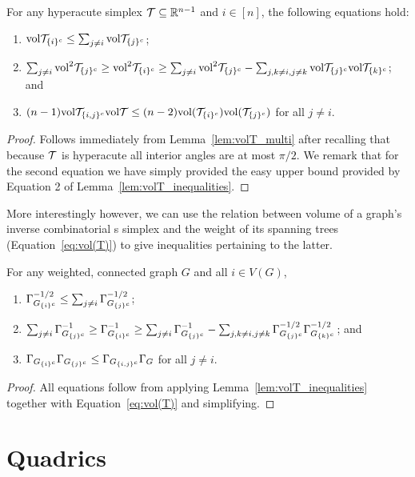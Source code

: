 \begin{lemma}
\label{lem:volT_inequalities}
For any hyperacute simplex $\mathcal{T}\subseteq\mathbb{R}^{n-1}$ and  $i\in[n]$, the following equations hold:
\begin{enumerate}
	\item $\textnormal{vol}\mathcal{T}_{\{i\}^c} \leq \sum_{j\neq i}\textnormal{vol}\mathcal{T}_{\{j\}^c}$;
	\item $\sum_{j\neq i}\textnormal{vol}^2\mathcal{T}_{\{j\}^c}\geq \textnormal{vol}^2\mathcal{T}_{\{i\}^c}\geq   \sum_{j\neq i}\textnormal{vol}^2\mathcal{T}_{\{j\}^c} - \sum_{j,k\neq i,j\neq k} \textnormal{vol}\mathcal{T}_{\{j\}^c}\textnormal{vol}\mathcal{T}_{\{k\}^c}$; and
	\item $(n-1)\textnormal{vol}\mathcal{T}_{\{i,j\}^c}\textnormal{vol}\mathcal{T} \leq  (n-2)\textnormal{vol}(\mathcal{T}_{\{i\}^c})\textnormal{vol}(\mathcal{T}_{\{j\}^c})$ for  all $j\neq i$.
\end{enumerate}
\end{lemma}
\begin{proof}
	Follows immediately from Lemma~\ref{lem:volT_multi} after  recalling that because $\mathcal{T}$  is  hyperacute all interior  angles are at most $\pi/2$. We remark that for the second  equation  we have simply provided the  easy  upper bound provided by Equation 2 of Lemma~\ref{lem:volT_inequalities}. 
\end{proof}

More interestingly  however,  we can use the relation between volume of a  graph's inverse combinatorial s simplex and the weight of its spanning trees (Equation~\eqref{eq:vol(T)})  to give inequalities pertaining to the latter.  

\begin{lemma}
	\label{lem:tree_inequalities}
	For any weighted,  connected  graph  $G$ and all $i\in V(G)$, 
	\begin{enumerate}
		\item $\Gamma_{G_{\{i\}^c}}^{-1/2} \leq \sum_{j\neq i}\Gamma_{G_{\{j\}^c}}^{-1/2}$;
		\item $\sum_{j\neq i}\Gamma_{G_{\{j\}^c}}^{-1} \geq \Gamma_{G_{\{i\}^c}}^{-1} \geq \sum_{j\neq i}\Gamma_{G_{\{j\}^c}}^{-1} - \sum_{j,k\neq i,j\neq k}\Gamma_{G_{\{j\}^c}}^{-1/2}\Gamma_{G_{\{k\}^c}}^{-1/2}$; and 
		\item $\Gamma_{G_{\{i\}^c}}\Gamma_{G_{\{j\}^c}}\leq \Gamma_{G_{\{i,j\}^c}}\Gamma_G$ for all $j\neq i$. 
	\end{enumerate}
\end{lemma}
\begin{proof}
	All  equations follow from applying Lemma~\ref{lem:volT_inequalities}  together with Equation~\ref{eq:vol(T)} and simplifying. 
\end{proof}


\section{Quadrics}
\label{sec:quadrics}

